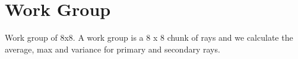 \section{Work Group}

Work group of 8x8. A work group is a 8 x 8 chunk of rays and we calculate the average, max and variance for primary and secondary rays.


